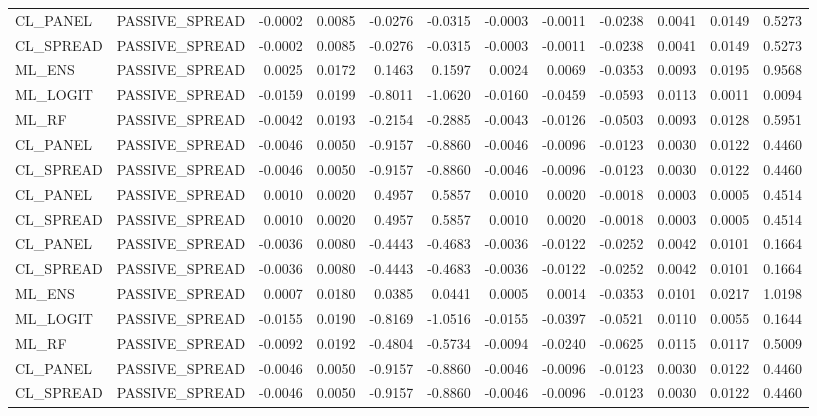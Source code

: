 \begin{table}
\begin{tabular}{llrrrrrrrrrr}
CL_PANEL & PASSIVE_SPREAD & -0.0002 & 0.0085 & -0.0276 & -0.0315 & -0.0003 & -0.0011 & -0.0238 & 0.0041 & 0.0149 & 0.5273 \\
CL_SPREAD & PASSIVE_SPREAD & -0.0002 & 0.0085 & -0.0276 & -0.0315 & -0.0003 & -0.0011 & -0.0238 & 0.0041 & 0.0149 & 0.5273 \\
ML_ENS & PASSIVE_SPREAD & 0.0025 & 0.0172 & 0.1463 & 0.1597 & 0.0024 & 0.0069 & -0.0353 & 0.0093 & 0.0195 & 0.9568 \\
ML_LOGIT & PASSIVE_SPREAD & -0.0159 & 0.0199 & -0.8011 & -1.0620 & -0.0160 & -0.0459 & -0.0593 & 0.0113 & 0.0011 & 0.0094 \\
ML_RF & PASSIVE_SPREAD & -0.0042 & 0.0193 & -0.2154 & -0.2885 & -0.0043 & -0.0126 & -0.0503 & 0.0093 & 0.0128 & 0.5951 \\
CL_PANEL & PASSIVE_SPREAD & -0.0046 & 0.0050 & -0.9157 & -0.8860 & -0.0046 & -0.0096 & -0.0123 & 0.0030 & 0.0122 & 0.4460 \\
CL_SPREAD & PASSIVE_SPREAD & -0.0046 & 0.0050 & -0.9157 & -0.8860 & -0.0046 & -0.0096 & -0.0123 & 0.0030 & 0.0122 & 0.4460 \\
CL_PANEL & PASSIVE_SPREAD & 0.0010 & 0.0020 & 0.4957 & 0.5857 & 0.0010 & 0.0020 & -0.0018 & 0.0003 & 0.0005 & 0.4514 \\
CL_SPREAD & PASSIVE_SPREAD & 0.0010 & 0.0020 & 0.4957 & 0.5857 & 0.0010 & 0.0020 & -0.0018 & 0.0003 & 0.0005 & 0.4514 \\
CL_PANEL & PASSIVE_SPREAD & -0.0036 & 0.0080 & -0.4443 & -0.4683 & -0.0036 & -0.0122 & -0.0252 & 0.0042 & 0.0101 & 0.1664 \\
CL_SPREAD & PASSIVE_SPREAD & -0.0036 & 0.0080 & -0.4443 & -0.4683 & -0.0036 & -0.0122 & -0.0252 & 0.0042 & 0.0101 & 0.1664 \\
ML_ENS & PASSIVE_SPREAD & 0.0007 & 0.0180 & 0.0385 & 0.0441 & 0.0005 & 0.0014 & -0.0353 & 0.0101 & 0.0217 & 1.0198 \\
ML_LOGIT & PASSIVE_SPREAD & -0.0155 & 0.0190 & -0.8169 & -1.0516 & -0.0155 & -0.0397 & -0.0521 & 0.0110 & 0.0055 & 0.1644 \\
ML_RF & PASSIVE_SPREAD & -0.0092 & 0.0192 & -0.4804 & -0.5734 & -0.0094 & -0.0240 & -0.0625 & 0.0115 & 0.0117 & 0.5009 \\
CL_PANEL & PASSIVE_SPREAD & -0.0046 & 0.0050 & -0.9157 & -0.8860 & -0.0046 & -0.0096 & -0.0123 & 0.0030 & 0.0122 & 0.4460 \\
CL_SPREAD & PASSIVE_SPREAD & -0.0046 & 0.0050 & -0.9157 & -0.8860 & -0.0046 & -0.0096 & -0.0123 & 0.0030 & 0.0122 & 0.4460 \\

\end{tabular}
\end{table}
